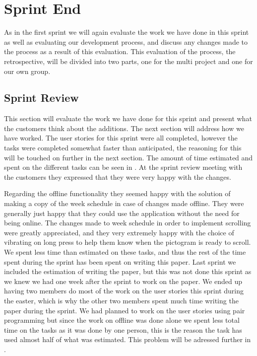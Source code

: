 \chapter{Sprint End}
As in the first sprint we will again evaluate the work we have done in this sprint as well as evaluating our development process, and discuss any changes made to the process as a result of this evaluation.
This evaluation of the process, the retrospective, will be divided into two parts, one for the multi project and one for our own group.
\section{Sprint Review}
This section will evaluate the work we have done for this sprint and present what the customers think about the additions.
The next section will address how we have worked.
The user stories for this sprint were all completed, however the tasks were completed somewhat faster than anticipated, the reasoning for this will be touched on further in the next section.
The amount of time estimated and spent on the different tasks can be seen in .
At the sprint review meeting with the customers they expressed that they were very happy with the changes.

Regarding the offline functionality they seemed happy with the solution of making a copy of the week schedule in case of changes made offline.
They were generally just happy that they could use the application without the need for being online.
The changes made to week schedule in order to implement scrolling were greatly appreciated, and they very extremely happy with the choice of vibrating on long press to help them know when the pictogram is ready to scroll.
We spent less time than estimated on these tasks, and thus the rest of the time spent during the sprint has been spent on writing this paper.
Last sprint we included the estimation of writing the paper, but this was not done this sprint as we knew we had one week after the sprint to work on the paper.
We ended up having two members do most of the work on the user stories this sprint during the easter, which is why the other two members spent much time writing the paper during the sprint.
We had planned to work on the user stories using pair programming but since the work on offline was done alone we spent less total time on the tasks as it was done by one person, this is the reason the task has used almost half of what was estimated.
This problem will be adressed further in .

